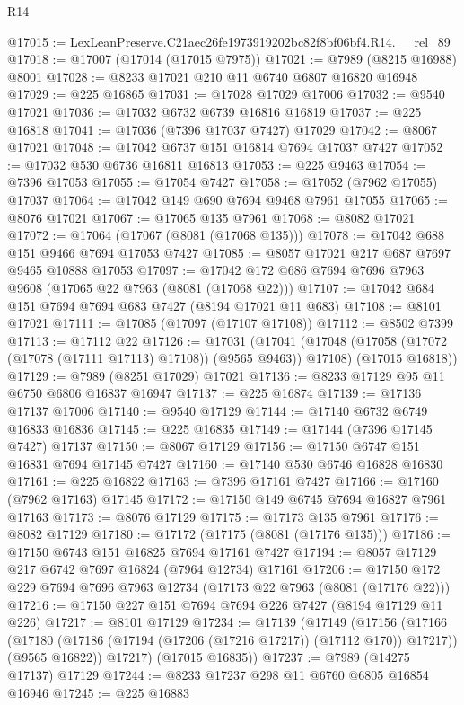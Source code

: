 \begin{lexlean}{R14}
\begin{coremodule}
@17015 := LexLeanPreserve.C21aec26fe1973919202bc82f8bf06bf4.R14.__rel_89
@17018 := @17007 (@17014 (@17015 @7975))
@17021 := @7989 (@8215 @16988) @8001
@17028 := @8233 @17021 @210 @11 @6740 @6807 @16820 @16948
@17029 := @225 @16865
@17031 := @17028 @17029 @17006
@17032 := @9540 @17021
@17036 := @17032 @6732 @6739 @16816 @16819
@17037 := @225 @16818
@17041 := @17036 (@7396 @17037 @7427) @17029
@17042 := @8067 @17021
@17048 := @17042 @6737 @151 @16814 @7694 @17037 @7427
@17052 := @17032 @530 @6736 @16811 @16813
@17053 := @225 @9463
@17054 := @7396 @17053
@17055 := @17054 @7427
@17058 := @17052 (@7962 @17055) @17037
@17064 := @17042 @149 @690 @7694 @9468 @7961 @17055
@17065 := @8076 @17021
@17067 := @17065 @135 @7961
@17068 := @8082 @17021
@17072 := @17064 (@17067 (@8081 (@17068 @135)))
@17078 := @17042 @688 @151 @9466 @7694 @17053 @7427
@17085 := @8057 @17021 @217 @687 @7697 @9465 @10888 @17053
@17097 := @17042 @172 @686 @7694 @7696 @7963 @9608 (@17065 @22 @7963 (@8081 (@17068 @22)))
@17107 := @17042 @684 @151 @7694 @7694 @683 @7427 (@8194 @17021 @11 @683)
@17108 := @8101 @17021
@17111 := @17085 (@17097 (@17107 @17108))
@17112 := @8502 @7399
@17113 := @17112 @22
@17126 := @17031
    (@17041
      (@17048 (@17058 (@17072 (@17078 (@17111 @17113) @17108)) (@9565 @9463)) @17108)
      (@17015 @16818))
@17129 := @7989 (@8251 @17029) @17021
@17136 := @8233 @17129 @95 @11 @6750 @6806 @16837 @16947
@17137 := @225 @16874
@17139 := @17136 @17137 @17006
@17140 := @9540 @17129
@17144 := @17140 @6732 @6749 @16833 @16836
@17145 := @225 @16835
@17149 := @17144 (@7396 @17145 @7427) @17137
@17150 := @8067 @17129
@17156 := @17150 @6747 @151 @16831 @7694 @17145 @7427
@17160 := @17140 @530 @6746 @16828 @16830
@17161 := @225 @16822
@17163 := @7396 @17161 @7427
@17166 := @17160 (@7962 @17163) @17145
@17172 := @17150 @149 @6745 @7694 @16827 @7961 @17163
@17173 := @8076 @17129
@17175 := @17173 @135 @7961
@17176 := @8082 @17129
@17180 := @17172 (@17175 (@8081 (@17176 @135)))
@17186 := @17150 @6743 @151 @16825 @7694 @17161 @7427
@17194 := @8057 @17129 @217 @6742 @7697 @16824 (@7964 @12734) @17161
@17206 := @17150 @172 @229 @7694 @7696 @7963 @12734 (@17173 @22 @7963 (@8081 (@17176 @22)))
@17216 := @17150 @227 @151 @7694 @7694 @226 @7427 (@8194 @17129 @11 @226)
@17217 := @8101 @17129
@17234 := @17139
    (@17149
      (@17156
        (@17166
          (@17180 (@17186 (@17194 (@17206 (@17216 @17217)) (@17112 @170)) @17217))
          (@9565 @16822))
        @17217)
      (@17015 @16835))
@17237 := @7989 (@14275 @17137) @17129
@17244 := @8233 @17237 @298 @11 @6760 @6805 @16854 @16946
@17245 := @225 @16883

\end{coremodule}
\end{lexlean}
